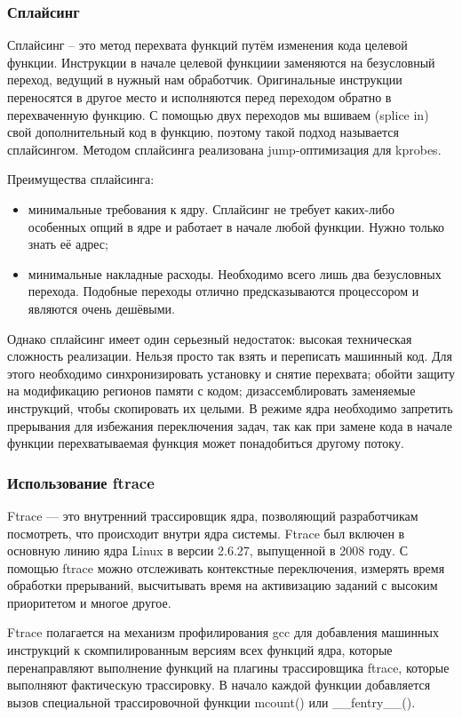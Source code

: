 \documentclass[a4paper,14pt]{article}
\begin{document}
\subsubsection{Сплайсинг}

Сплайсинг -- это метод перехвата функций путём изменения кода целевой функции. Инструкции в начале целевой функциии заменяются на безусловный переход, ведущий в нужный нам обработчик. Оригинальные инструкции переносятся в другое место и исполняются перед переходом обратно в перехваченную функцию. С помощью двух переходов мы вшиваем (splice in) свой дополнительный код в функцию, поэтому такой подход называется сплайсингом. Методом сплайсинга реализована jump-оптимизация для kprobes.

Преимущества сплайсинга:

\begin{itemize}
	\item минимальные требования к ядру. Сплайсинг не требует каких-либо особенных опций в ядре и работает в начале любой функции. Нужно только знать её адрес;
	\item минимальные накладные расходы. Необходимо всего лишь два безусловных перехода. Подобные переходы отлично предсказываются процессором и являются очень дешёвыми.
\end{itemize}

Однако сплайсинг имеет один серьезный недостаток: высокая техническая сложность реализации. Нельзя просто так взять и переписать машинный код. Для этого необходимо синхронизировать установку и снятие перехвата; обойти защиту на модификацию регионов памяти с кодом; дизассемблировать заменяемые инструкций, чтобы скопировать их целыми. В режиме ядра необходимо запретить прерывания для избежания переключения задач, так как при замене кода в начале функции перехватываемая функция может понадобиться другому потоку.

\subsubsection{Использование ftrace}

Ftrace — это внутренний трассировщик ядра, позволяющий разработчикам посмотреть, что происходит внутри ядра системы. Ftrace был включен в основную линию ядра Linux в версии 2.6.27, выпущенной в 2008 году. С помощью ftrace можно отслеживать контекстные переключения, измерять время обработки прерываний, высчитывать время на активизацию заданий с высоким приоритетом и многое другое.

Ftrace полагается на механизм профилирования gcc для добавления машинных инструкций к скомпилированным версиям всех функций ядра, которые перенаправляют выполнение функций на плагины трассировщика ftrace, которые выполняют фактическую трассировку. В начало каждой функции добавляется вызов специальной трассировочной функции mcount() или \_\_fentry\_\_(). 
\end{document}
